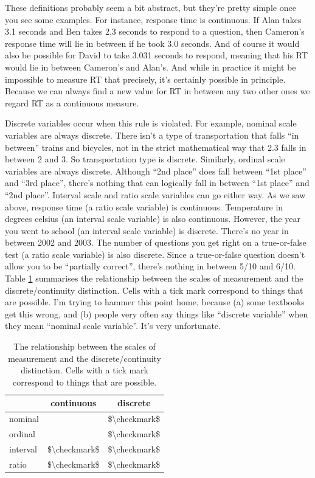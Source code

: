 \documentclass[
]{book}
\begin{document}
These definitions probably seem a bit abstract, but they're pretty simple once you see some examples. For instance, response time is continuous. If Alan takes 3.1 seconds and Ben takes 2.3 seconds to respond to a question, then Cameron's response time will lie in between if he took 3.0 seconds. And of course it would also be possible for David to take 3.031 seconds to respond, meaning that his RT would lie in between Cameron's and Alan's. And while in practice it might be impossible to measure RT that precisely, it's certainly possible in principle. Because we can always find a new value for RT in between any two other ones we regard RT as a continuous measure.

Discrete variables occur when this rule is violated. For example, nominal scale variables are always discrete. There isn't a type of transportation that falls ``in between'' trains and bicycles, not in the strict mathematical way that 2.3 falls in between 2 and 3. So transportation type is discrete. Similarly, ordinal scale variables are always discrete. Although ``2nd place'' does fall between ``1st place'' and ``3rd place'', there's nothing that can logically fall in between ``1st place'' and ``2nd place''. Interval scale and ratio scale variables can go either way. As we saw above, response time (a ratio scale variable) is continuous. Temperature in degrees celsius (an interval scale variable) is also continuous. However, the year you went to school (an interval scale variable) is discrete. There's no year in between 2002 and 2003. The number of questions you get right on a true-or-false test (a ratio scale variable) is also discrete. Since a true-or-false question doesn't allow you to be ``partially correct'', there's nothing in between 5/10 and 6/10. Table \ref{tab:scalescont} summarises the relationship between the scales of measurement and the discrete/continuity distinction. Cells with a tick mark correspond to things that are possible. I'm trying to hammer this point home, because (a) some textbooks get this wrong, and (b) people very often say things like ``discrete variable'' when they mean ``nominal scale variable''. It's very unfortunate.

\begin{table}

\caption{\label{tab:scalescont}The relationship between the scales of measurement and the discrete/continuity distinction. Cells with a tick mark correspond to things that are possible.}
\centering
\begin{tabular}[t]{lcc}
\toprule
 & continuous & discrete\\
\midrule
nominal &  & \$\textbackslash{}checkmark\$\\
ordinal &  & \$\textbackslash{}checkmark\$\\
interval & \$\textbackslash{}checkmark\$ & \$\textbackslash{}checkmark\$\\
ratio & \$\textbackslash{}checkmark\$ & \$\textbackslash{}checkmark\$\\
\bottomrule
\end{tabular}
\end{table}
\end{document}
